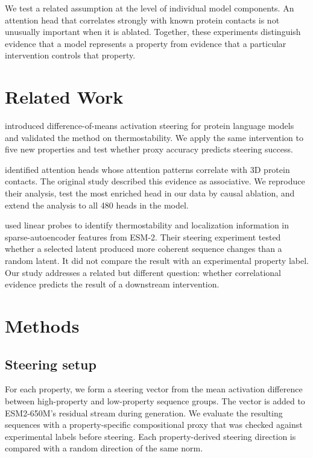 \documentclass{article}
\begin{document}
We test a related assumption at the level of individual model components.
An attention head that correlates strongly with known protein contacts
is not unusually important when it is ablated. Together, these
experiments distinguish evidence that a model represents a property from
evidence that a particular intervention controls that property.

\section{Related Work}

\citet{huang2025steering} introduced difference-of-means activation
steering for protein language models and validated the method on
thermostability. We apply the same intervention to five new properties
and test whether proxy accuracy predicts steering success.

\citet{vig2021bertology} identified attention heads whose attention
patterns correlate with 3D protein contacts. The original study
described this evidence as associative. We reproduce their analysis,
test the most enriched head in our data by causal ablation, and extend
the analysis to all 480 heads in the model.

\citet{adams2025mechanistic} used linear probes to identify
thermostability and localization information in sparse-autoencoder
features from ESM-2. Their steering experiment tested whether a selected
latent produced more coherent sequence changes than a random latent. It
did not compare the result with an experimental property label. Our
study addresses a related but different question: whether correlational
evidence predicts the result of a downstream intervention.

\section{Methods}
\label{sec:method}

\subsection{Steering setup}

For each property, we form a steering vector from the mean activation
difference between high-property and low-property sequence groups. The
vector is added to ESM2-650M's residual stream during generation. We
evaluate the resulting sequences with a property-specific compositional
proxy that was checked against experimental labels before steering. Each
property-derived steering direction is compared with a random direction
of the same norm.
\end{document}
